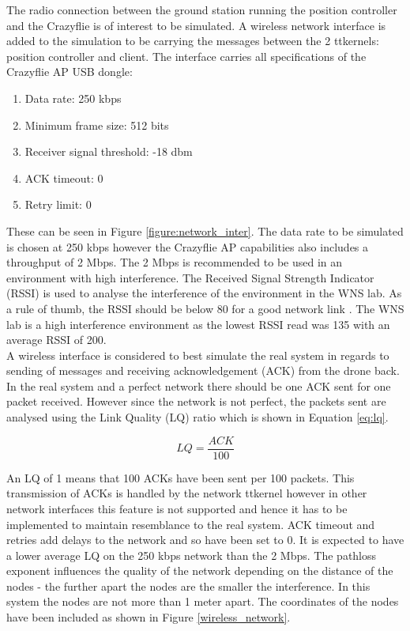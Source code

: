 The radio connection between the ground station running the position controller and the Crazyflie is of interest to be simulated. A wireless network interface is added to the simulation to be carrying the messages between the 2 ttkernels: position controller and client. The interface carries all specifications of the Crazyflie AP USB dongle: 

\begin{enumerate}
    \item Data rate: 250 kbps
    \item Minimum frame size: 512 bits
    \item Receiver signal threshold: -18 dbm
    \item ACK timeout: 0
    \item Retry limit: 0
\end{enumerate}

These can be seen in Figure \ref{figure:network_inter}. The data rate to be simulated is chosen at 250 kbps however the Crazyflie AP capabilities also includes a throughput of 2 Mbps. The 2 Mbps is recommended to be used in an environment with high interference. The Received Signal Strength Indicator (RSSI) is used to analyse the interference of the environment in the WNS lab. As a rule of thumb, the RSSI should be below 80 for a good network link \cite{book_ros}. The WNS lab is a high interference environment as the lowest RSSI read was 135 with an average RSSI of 200.\\ 

A wireless interface is considered to best simulate the real system in regards to sending of messages and receiving acknowledgement (ACK) from the drone back. In the real system and a perfect network there should be one ACK sent for one packet received. However since the network is not perfect, the packets sent are analysed using the Link Quality (LQ) ratio which is shown in Equation \ref{eq:lq}. 

\begin{equation} \label{eq:lq}
	LQ = \frac{ACK}{100}
\end{equation}


An LQ of 1 means that 100 ACKs have been sent per 100 packets. This transmission of ACKs is handled by the network ttkernel however in other network interfaces this feature is not supported and hence it has to be implemented to maintain resemblance to the real system. ACK timeout and retries add delays to the network and so have been set to 0. It is expected to have a lower average LQ on the 250 kbps network than the 2 Mbps. The pathloss exponent influences the quality of the network depending on the distance of the nodes - the further apart the nodes are the smaller the interference. In this system the nodes are not more than 1 meter apart. The coordinates of the nodes have been included as shown in Figure \ref{wireless_network}.


